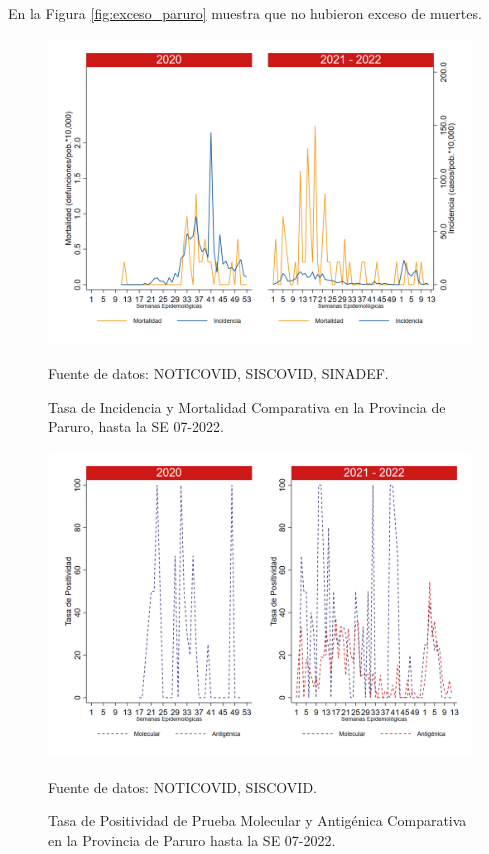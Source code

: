\documentclass[12pt,a4paper,openany]{book}
\begin{document}
	 En la Figura \ref{fig:exceso_paruro} muestra que no hubieron exceso de muertes. 
		
		\begin{figure}[h]
			\caption{Tasa de Incidencia y Mortalidad Comparativa en la Provincia de Paruro, hasta la SE 07-2022.}\label{fig:inc_mort_paruro}
			\begin{center}
				\includegraphics[width=0.85\linewidth]{../figuras/incidencia_mortalidad_20_21_10.png}
			\end{center}
			{\footnotesize {Fuente de datos: NOTICOVID, SISCOVID, SINADEF.}} 
		\end{figure}
		
		\begin{figure}[h]
			\caption{Tasa de Positividad de Prueba Molecular y Antigénica Comparativa en la Provincia de Paruro hasta la SE 07-2022.}\label{fig:positividad_paruro}
			\begin{center}
				\includegraphics[width=0.7\linewidth]{../figuras/positividad_20_21_10.png}
			\end{center}
			{\footnotesize {Fuente de datos: NOTICOVID, SISCOVID.}}
		\end{figure}
		
\end{document}
